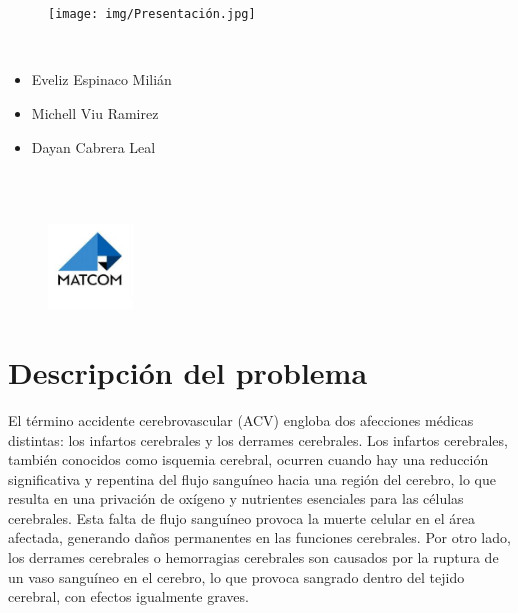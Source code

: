 \documentclass[a4paper, 12pt]{article}
\begin{document}
\graphicspath{{./}}

\begin{center}
\\
\vspace {1cm}
\\

\begin{figure}[h]
    \centering
    \texttt{[image: img/Presentación.jpg]}
\end{figure}

\\
\begin{itemize}
\centering
\item Eveliz Espinaco Milián
\item Michell Viu Ramirez
\item Dayan Cabrera Leal
\end{itemize}
\vspace {0.5cm}
\\
\\

\begin{figure}[h]
    \centering
    \includegraphics[width=0.2\textwidth]{img/MATCOM.jpg}
\end{figure}



\end{center}

\newpage
\tableofcontents

\newpage
\section{Descripción del problema}
El término accidente cerebrovascular (ACV) engloba dos afecciones médicas distintas: los infartos cerebrales y los derrames cerebrales. Los infartos cerebrales, también conocidos como isquemia cerebral, ocurren cuando hay una reducción significativa y repentina del flujo sanguíneo hacia una región del cerebro, lo que resulta en una privación de oxígeno y nutrientes esenciales para las células cerebrales. Esta falta de flujo sanguíneo provoca la muerte celular en el área afectada, generando daños permanentes en las funciones cerebrales. Por otro lado, los derrames cerebrales o hemorragias cerebrales son causados por la ruptura de un vaso sanguíneo en el cerebro, lo que provoca sangrado dentro del tejido cerebral, con efectos igualmente graves.
\end{document}
